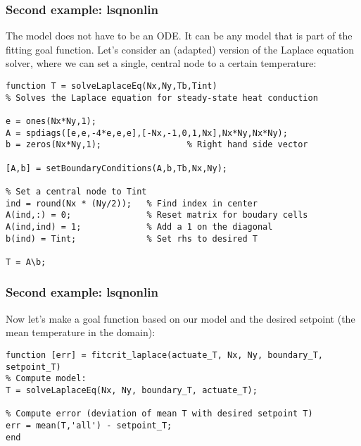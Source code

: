 \begin{frame}[fragile] 
  \frametitle{Second example: lsqnonlin}
  The model does not have to be an ODE. It can be any model that is part of the fitting goal function. Let's consider an (adapted) version of the Laplace equation solver, where we can set a single, central node to a certain temperature:
    \begin{lstlisting}
function T = solveLaplaceEq(Nx,Ny,Tb,Tint)
% Solves the Laplace equation for steady-state heat conduction

e = ones(Nx*Ny,1);
A = spdiags([e,e,-4*e,e,e],[-Nx,-1,0,1,Nx],Nx*Ny,Nx*Ny);
b = zeros(Nx*Ny,1);                 % Right hand side vector

[A,b] = setBoundaryConditions(A,b,Tb,Nx,Ny);

% Set a central node to Tint
ind = round(Nx * (Ny/2));   % Find index in center
A(ind,:) = 0;               % Reset matrix for boudary cells
A(ind,ind) = 1;             % Add a 1 on the diagonal
b(ind) = Tint;              % Set rhs to desired T

T = A\b;
    \end{lstlisting}
\end{frame}

\begin{frame}[fragile] 
  \frametitle{Second example: lsqnonlin}
  Now let's make a goal function based on our model and the desired setpoint (the mean temperature in the domain):
  \begin{lstlisting}
function [err] = fitcrit_laplace(actuate_T, Nx, Ny, boundary_T, setpoint_T)
% Compute model:
T = solveLaplaceEq(Nx, Ny, boundary_T, actuate_T);

% Compute error (deviation of mean T with desired setpoint T)
err = mean(T,'all') - setpoint_T;
end
    \end{lstlisting}
\end{frame}

